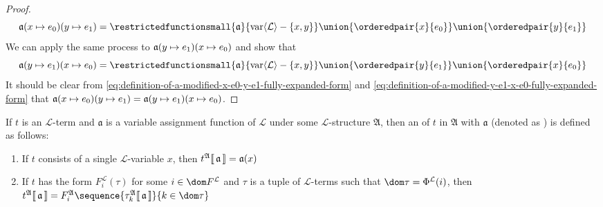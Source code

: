 \begin{proof}
    \begin{equation}
        \label{eq:definition-of-a-modified-x-e0-y-e1-fully-expanded-form}
        \folmodifiedvariableassignmentfunction{ \folmodifiedvariableassignmentfunction{\mathfrak{a}}{x}{e_{0}} }{y}{e_{1}} =
        \restrictedfunctionsmall{\mathfrak{a}}{ \folvars{\mathcal{L}} - \mleft\{ x, y \mright\} } \union \mleft\{ \orderedpair{x}{e_{0}} \mright\}
        \union \mleft\{ \orderedpair{y}{e_{1}} \mright\}
    \end{equation}
    We can apply the same process to \( \folmodifiedvariableassignmentfunction{ \folmodifiedvariableassignmentfunction{\mathfrak{a}}{y}{e_{1}} }{x}{e_{0}} \)
    and show that
    \begin{equation}
        \label{eq:definition-of-a-modified-y-e1-x-e0-fully-expanded-form}
        \folmodifiedvariableassignmentfunction{ \folmodifiedvariableassignmentfunction{\mathfrak{a}}{y}{e_{1}} }{x}{e_{0}} =
        \restrictedfunctionsmall{\mathfrak{a}}{ \folvars{\mathcal{L}} - \mleft\{ x, y \mright\} } \union \mleft\{ \orderedpair{y}{e_{1}} \mright\}
        \union \mleft\{ \orderedpair{x}{e_{0}} \mright\}
    \end{equation}
    It should be clear from \eqref{eq:definition-of-a-modified-x-e0-y-e1-fully-expanded-form} and \eqref{eq:definition-of-a-modified-y-e1-x-e0-fully-expanded-form} that
    \( \folmodifiedvariableassignmentfunction{ \folmodifiedvariableassignmentfunction{\mathfrak{a}}{x}{e_{0}} }{y}{e_{1}} =
        \folmodifiedvariableassignmentfunction{ \folmodifiedvariableassignmentfunction{\mathfrak{a}}{y}{e_{1}} }{x}{e_{0}}\).
\end{proof}

\begin{dfn}
     \label{dfn:first-order-language-interpretation-of-terms}
    If \( t \) is an \( \mathcal{L} \)-term and \( \mathfrak{a} \) is a variable assignment function of \( \mathcal{L} \) under some \( \mathcal{L} \)-structure \( \mathfrak{A} \),
    then an  of \( t \) in \( \mathfrak{A} \) with \( \mathfrak{a} \)
    (denoted as ) is defined as follows:
    \begin{enumerate}[topsep=2pt,label=\textup{\texttt{(\alph*)}}]
        \item If \( t \) consists of a single \( \mathcal{L} \)-variable \( x \), then \( t^{\mathfrak{A}}\llbracket\, \mathfrak{a} \,\rrbracket = \mathfrak{a}(x) \)
        \item If \( t \) has the form \( F^{\mathcal{L}}_{i}(\tau) \) for some \( i \in \dom F^{\mathcal{L}} \) and \( \tau \) is a tuple of \( \mathcal{L} \)-terms
            such that \( \dom \tau = \Phi^{\mathcal{L}}(i) \),
            then \( \folterminterpretation{t}{\mathfrak{A}}{\mathfrak{a}} = 
            F^{\mathfrak{A}}_{i} \sequence{\folterminterpretation{\tau_{k}}{\mathfrak{A}}{\mathfrak{a}}}{k \in \dom \tau}\)
    \end{enumerate}
\end{dfn}


